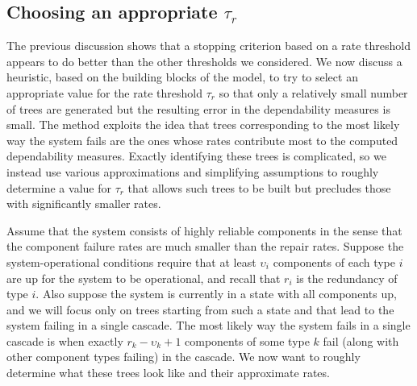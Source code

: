 \documentclass[12pt]{article}
\begin{document}
\begin{minipage}[c]{\textwidth}
	\label{fig:graph125}
\end{minipage}



\subsection{Choosing an appropriate $\tau_r$}
\label{sec:dijkstra}

The previous discussion shows that
a stopping criterion based on
a rate threshold appears to do
better than the other thresholds
we considered.
We now discuss a heuristic, based
on the building blocks of the model, to
try to select an appropriate value for
the rate threshold
$\tau_r$ so that only a relatively
small number of trees are generated
but the resulting error in the
dependability measures is small.
The method exploits the idea
that trees corresponding to the
most likely way the system fails
are the ones whose rates contribute most
to the computed dependability measures.
Exactly identifying these trees is
complicated,
so we instead use various
approximations and simplifying
assumptions to roughly determine
a value for $\tau_r$ that allows
such trees to be built but precludes
those with significantly smaller
rates.

Assume that the system consists
of highly reliable components
\cite{GSHNG:1992}
in the sense 
that the component
failure rates are much smaller than
the repair rates.
Suppose the system-operational
conditions require that
at least $\upsilon_i$ components
of each type $i$ are up
for the system to be operational,
and recall that $r_i$ is the
redundancy of type $i$.
Also suppose the system is currently
in a state with all components
up,
and we will focus only on trees
starting from such a state and that
lead to the system failing
in a single cascade.
The most likely way the
system fails in a single cascade is
when exactly $r_k - \upsilon_k + 1$ components
of some type $k$
fail (along with
other component types failing)
in the cascade.
We now want to roughly determine
what these trees look like
and their approximate rates.
\end{document}
